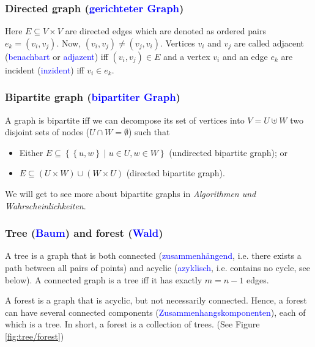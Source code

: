 \documentclass[a4paper]{article}
\begin{document}
\subsubsection{Directed graph (\textcolor{blue}{{gerichteter Graph}})}
Here $E\subseteq V\times V$ are directed edges which are denoted as ordered pairs $e_k=\left(v_i, v_j\right)$. Now, $\left(v_i, v_j\right) \neq \left(v_j, v_i\right)$. Vertices $v_i$ and $v_j$ are called adjacent (\textcolor{blue}{{benachbart}} or \textcolor{blue}{{adjazent}}) iff $\left(v_i, v_j \right) \in E$ and a vertex $v_i$ and an edge $e_k$ are incident (\textcolor{blue}{{inzident}}) iff $v_i \in e_k$.

\subsubsection{Bipartite graph (\textcolor{blue}{{bipartiter Graph}})}
A graph is bipartite iff we can decompose its set of vertices into $V=U\uplus W$ two disjoint sets of nodes ($U \cap W=\emptyset$) such that
\begin{itemize}
\item Either $E\subseteq \left\lbrace \left\lbrace u,w \right\rbrace \mid u\in U, w\in W \right\rbrace$ (undirected bipartite graph); or
\item $E\subseteq (U\times W) \cup (W\times U)$ (directed bipartite graph).
\end{itemize}
We will get to see more about bipartite graphs in \textit{Algorithmen und Wahrscheinlichkeiten}.

\subsubsection{Tree (\textcolor{blue}{{Baum}}) and forest (\textcolor{blue}{{Wald}})}
A tree is a graph that is both connected (\textcolor{blue}{{zusammenhängend}}, i.e. there exists a path between all pairs of points) and acyclic (\textcolor{blue}{{azyklisch}}, i.e. contains no cycle, see below). A connected graph is a tree iff it has exactly $m=n-1$ edges.

A forest is a graph that is acyclic, but not necessarily connected. Hence, a forest can have several connected components (\textcolor{blue}{{Zusammenhangskomponenten}}), each of which is a tree. In short, a forest is a collection of trees. (See Figure \ref{fig:tree/forest})
\end{document}
